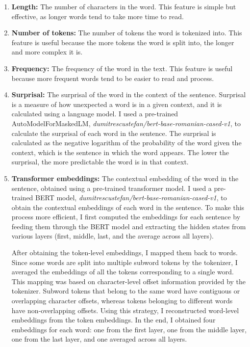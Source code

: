 \begin{enumerate}
    \item \textbf{Length:} The number of characters in the word. This feature is simple but effective, as longer words tend to take more time to read.
    
    \item \textbf{Number of tokens:} The number of tokens the word is tokenized into. This feature is useful because the more tokens the word is split into, the longer and more complex it is.
    
    \item \textbf{Frequency:} The frequency of the word in the text. This feature is useful because more frequent words tend to be easier to read and process.
    
    \item \textbf{Surprisal:} The surprisal of the word in the context of the sentence. Surprisal is a measure of how unexpected a word is in a given context, and it is calculated using a language model. I used a pre-trained AutoModelForMaskedLM, \textit{dumitrescustefan/bert-base-romanian-cased-v1}, to calculate the surprisal of each word in the sentence. The surprisal is calculated as the negative logarithm of the probability of the word given the context, which is the sentence in which the word appears. The lower the surprisal, the more predictable the word is in that context.
    
    \item \textbf{Transformer embeddings:} The contextual embedding of the word in the sentence, obtained using a pre-trained transformer model. I used a pre-trained BERT model, \textit{dumitrescustefan/bert-base-romanian-cased-v1}, to obtain the contextual embeddings of each word in the sentence. To make this process more efficient, I first computed the embeddings for each sentence by feeding them through the BERT model and extracting the hidden states from various layers (first, middle, last, and the average across all layers).

    After obtaining the token-level embeddings, I mapped them back to words. Since some words are split into multiple subword tokens by the tokenizer, I averaged the embeddings of all the tokens corresponding to a single word. This mapping was based on character-level offset information provided by the tokenizer. Subword tokens that belong to the same word have contiguous or overlapping character offsets, whereas tokens belonging to different words have non-overlapping offsets. Using this strategy, I reconstructed word-level embeddings from the token embeddings. In the end, I obtained four embeddings for each word: one from the first layer, one from the middle layer, one from the last layer, and one averaged across all layers.
\end{enumerate}


